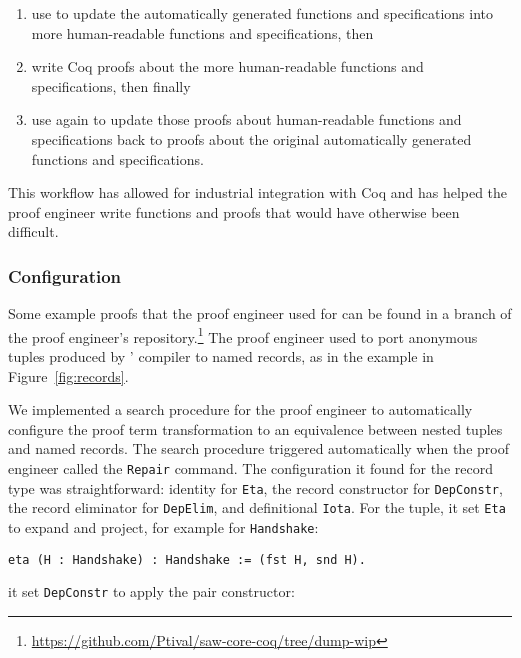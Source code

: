 \begin{enumerate}
\item use \toolname to update the automatically generated functions and specifications into more
human-readable functions and specifications, then
\item write Coq proofs about the more human-readable functions and specifications, then finally
\item use \toolname again to update those proofs about human-readable functions and specifications back to
proofs about the original automatically generated functions and specifications.
\end{enumerate}
This workflow has allowed for industrial integration with Coq and has helped the proof engineer write functions and proofs
that would have otherwise been difficult.


\subsubsection{Configuration}

\begin{figure*}
\begin{minipage}{0.33\textwidth}
   
\end{minipage}
\hfill
\begin{minipage}{0.66\textwidth}
   
\end{minipage}
\vspace{-0.5cm}
\caption{Two unnamed tuples (left) and corresponding named records (right).}
\label{fig:records}
\end{figure*}

Some example proofs that the proof engineer used \toolname for
can be found in a branch of the proof engineer's repository.\footnote{\url{https://github.com/Ptival/saw-core-coq/tree/dump-wip}}
The proof engineer used \toolname to port anonymous tuples produced by \company' compiler
to named records, as in the example in Figure~\ref{fig:records}.

We implemented a search procedure for the proof engineer to automatically configure the proof term transformation to an equivalence
between nested tuples and named records.
The search procedure triggered automatically when the proof engineer called the \lstinline{Repair} command.
The configuration it found for the record type was straightforward: identity for \lstinline{Eta},
the record constructor for \lstinline{DepConstr}, the record eliminator for \lstinline{DepElim}, and definitional \lstinline{Iota}.
For the tuple, it set \lstinline{Eta} to expand and project, for example for \lstinline{Handshake}:
\begin{lstlisting}[backgroundcolor=\color{cyan!30}]
eta (H : Handshake) : Handshake := (fst H, snd H).
\end{lstlisting}
it set \lstinline{DepConstr} to apply the pair constructor:

